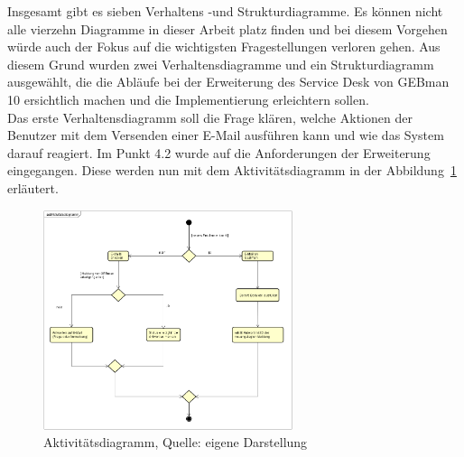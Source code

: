 \noindent
Insgesamt gibt es sieben Verhaltens -und Strukturdiagramme. Es können nicht alle vierzehn Diagramme in dieser Arbeit platz finden und bei diesem Vorgehen würde auch der Fokus auf die wichtigsten Fragestellungen verloren  gehen. Aus diesem Grund wurden zwei Verhaltensdiagramme und ein Strukturdiagramm ausgewählt, die die Abläufe bei der Erweiterung des Service Desk von GEBman 10 ersichtlich machen und die Implementierung erleichtern sollen. \\

\noindent
Das erste Verhaltensdiagramm soll die Frage klären, welche Aktionen der Benutzer mit dem Versenden einer E-Mail ausführen kann und wie das System darauf reagiert. Im Punkt 4.2 wurde auf die Anforderungen der Erweiterung eingegangen. Diese werden nun mit dem Aktivitätsdiagramm  in der Abbildung~\ref{fig:Aktivitaetsdiagramm} erläutert.

\begin{figure}[h!]
\centering
\includegraphics[width=0.65\textwidth]{Abbildungen/Aktivitaetsdiagramm.png}
	\caption[Aktivit{\"a}tsdiagramm]{Aktivit{\"a}tsdiagramm, Quelle: eigene Darstellung}
	\label{fig:Aktivitaetsdiagramm}
\end{figure}

